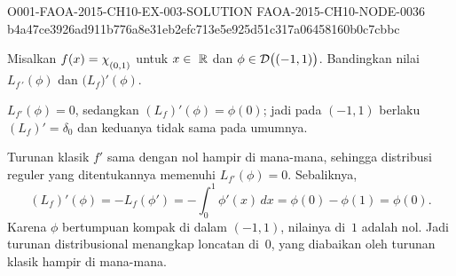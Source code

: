 \begin{o001solution}
  {O001-FAOA-2015-CH10-EX-003-SOLUTION}
  {FAOA-2015-CH10-NODE-0036}
  {b4a47ce3926ad911b776a8e31eb2efc713e5e925d51c317a06458160b0c7cbbc}
\begin{o001statement}
Misalkan $f(x) = \chi_{{}_{\scriptstyle{(0,1)}}}$ untuk $x \in~\mathbb{R}$ dan $\phi \in \mathcal{D}\bigl((-1,1)\bigr)$. Bandingkan nilai $L_{f\,'}(\phi)$ dan
$\bigl(L_f\bigr)'(\phi)$.
\end{o001statement}
\begin{o001answer}
$L_{f'}(\phi)=0$, sedangkan $(L_f)'(\phi)=\phi(0)$; jadi pada
$(-1,1)$ berlaku $(L_f)'=\delta_0$ dan keduanya tidak sama pada umumnya.
\end{o001answer}
\begin{o001proof}
Turunan klasik $f'$ sama dengan nol hampir di mana-mana, sehingga distribusi
reguler yang ditentukannya memenuhi $L_{f'}(\phi)=0$. Sebaliknya,
\[
 (L_f)'(\phi)=-L_f(\phi')=-\int_0^1\phi'(x)\,dx
 =\phi(0)-\phi(1)=\phi(0).
\]
Karena $\phi$ bertumpuan kompak di dalam $(-1,1)$, nilainya di~$1$ adalah
nol. Jadi turunan distribusional menangkap loncatan di~$0$, yang diabaikan
oleh turunan klasik hampir di mana-mana.
\end{o001proof}
\end{o001solution}

